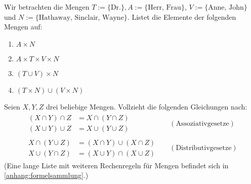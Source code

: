 \begin{aufg}
    Wir betrachten die Mengen $T := \{ \text{Dr.} \}, A := \{ \text{Herr, Frau} \}$, $V:= \{ \text{Anne, John} \}$ und $N := \{ \text{Hathaway, Sinclair, Wayne} \}$. Listet die Elemente der folgenden Mengen auf:
    \begin{enumerate}
	\item $A \times N$
	\item $A\times T \times V\times N$
	\item $(T \cup V) \times N$
	\item $(T\times N)\cup (V\times N)$
    \end{enumerate}
\end{aufg}


\begin{aufg} \label{aufg:capcupgesetze}
    Seien $X,Y,Z$ drei beliebige Mengen. Vollzieht die folgenden Gleichungen nach:
    \begin{align*}
        \begin{split}
            (X \cap Y) \cap Z & = X \cap (Y \cap Z) \\
            (X \cup Y) \cup Z & = X \cup (Y \cup Z)
        \end{split}
        && (\text{Assoziativgesetze}) \\[1em]
        \begin{split}
            X \cap (Y \cup Z) & = (X\cap Y) \cup (X\cap Z) \\
            X \cup (Y\cap Z) & = (X\cup Y) \cap (X\cup Z)
        \end{split}
        && ( \text{Distributivgesetze}) 
    \end{align*}
    (Eine lange Liste mit weiteren Rechenregeln für Mengen befindet sich in \cref{anhang:formelsammlung}.)
\end{aufg}

